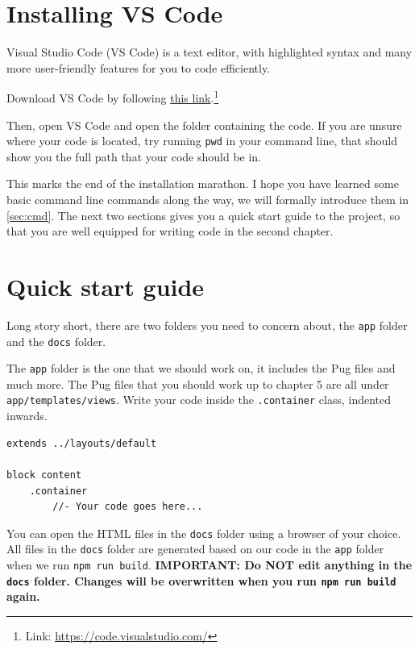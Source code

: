 \section{Installing VS Code}

Visual Studio Code (VS Code) is a text editor, with highlighted syntax and many more user-friendly features for you to code efficiently.

Download VS Code by following \href{https://code.visualstudio.com/}{this link}.\footnote{Link: \url{https://code.visualstudio.com/}}

\label{sec:pwdch1}
Then, open VS Code and open the folder containing the code. If you are unsure where your code is located, try running \texttt{pwd} in your command line, that should show you the full path that your code should be in.

\vspace{6mm}

This marks the end of the installation marathon. I hope you have learned some basic command line commands along the way, we will formally introduce them in \cref{sec:cmd}. The next two sections gives you a quick start guide to the project, so that you are well equipped for writing code in the second chapter.

\section{Quick start guide}
\label{sec:quickstart}

Long story short, there are two folders you need to concern about, the \texttt{app} folder and the \texttt{docs} folder. 

The \texttt{app} folder is the one that we should work on, it includes the Pug files and much more. The Pug files that you should work up to chapter 5 are all under \texttt{app/templates/views}. Write your code inside the \texttt{.container} class, indented inwards. 
\vspace{6mm}

\begin{lstlisting}[language=pug]
extends ../layouts/default

block content
	.container
		//- Your code goes here...
\end{lstlisting}
\vspace{6mm}

You can open the HTML files in the \texttt{docs} folder using a browser of your choice. All files in the \texttt{docs} folder are generated based on our code in the \texttt{app} folder when we run \texttt{npm run build}. \textbf{IMPORTANT: Do NOT edit anything in the \texttt{docs} folder. Changes will be overwritten when you run \texttt{npm run build} again.}

